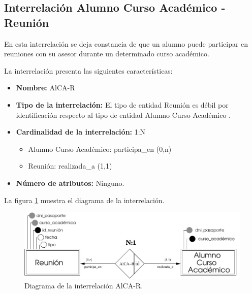 \subsection{Interrelación Alumno Curso Académico - Reunión}

   \begin{description}
      \item[Definición] En esta interrelación se deja constancia de que un
      alumno puede participar en reuniones con su asesor durante un determinado
      curso académico.

      \item[Características] La interrelación presenta las siguientes
                             características:

         \begin{itemize}
            \item \textbf{Nombre:} AlCA-R
            \item \textbf{Tipo de la interrelación:} El tipo de entidad Reunión
                  es débil por identificación respecto al tipo de entidad Alumno
                  Curso Académico .
            \item \textbf{Cardinalidad de la interrelación:} 1:N
                  \begin{itemize}
                     \item Alumno Curso Académico: participa\_en (0,n)
                     \item Reunión: realizada\_a (1,1)
                  \end{itemize}
            \item \textbf{Número de atributos:} Ninguno.
         \end{itemize}

      \item[Diagrama] La figura \ref{diagramaAlCA-R} muestra el diagrama de la
                      interrelación.

      \item \begin{figure}[!ht]
            \begin{center}
            \includegraphics[]{07.Modelo_Entidad-Interrelacion/7.3.Analisis_Interrelaciones/diagramas/AlCA-R.pdf}
            \caption{Diagrama de la interrelación AlCA-R.}
            \label{diagramaAlCA-R}
            \end{center}
         \end{figure}


\end{description}
